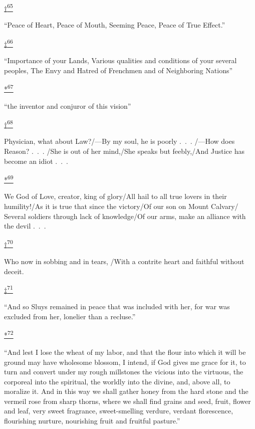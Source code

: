 \protect\hypertarget{23_NOTES.xhtmlux5cux23id_2824}{\protect\hyperlink{21_Chapter_Thirteen__IMAGE_AND_WORD.xhtmlux5cux23id_2823}{†\textsuperscript{65}}}
``Peace of Heart, Peace of Mouth, Seeming Peace, Peace of True Effect.''

\protect\hypertarget{23_NOTES.xhtmlux5cux23id_2822}{\protect\hyperlink{21_Chapter_Thirteen__IMAGE_AND_WORD.xhtmlux5cux23id_2821}{‡\textsuperscript{66}}}
``Importance of your Lands, Various qualities and conditions of your
several peoples, The Envy and Hatred of Frenchmen and of Neighboring
Nations''

\protect\hypertarget{23_NOTES.xhtmlux5cux23id_2820}{\protect\hyperlink{21_Chapter_Thirteen__IMAGE_AND_WORD.xhtmlux5cux23id_2819}{*\textsuperscript{67}}}
``the inventor and conjuror of this vision''

\protect\hypertarget{23_NOTES.xhtmlux5cux23id_2818}{\protect\hyperlink{21_Chapter_Thirteen__IMAGE_AND_WORD.xhtmlux5cux23id_2817}{†\textsuperscript{68}}}
Physician, what about Law?/---By my soul, he is poorly .~.~. /---How
does Reason? .~.~. /She is out of her mind,/She speaks but feebly,/And
Justice has become an idiot .~.~.

\protect\hypertarget{23_NOTES.xhtmlux5cux23id_2816}{\protect\hyperlink{21_Chapter_Thirteen__IMAGE_AND_WORD.xhtmlux5cux23id_2815}{*\textsuperscript{69}}}
We God of Love, creator, king of glory/All hail to all true lovers in
their humility!/As it is true that since the victory/Of our son on Mount
Calvary/ Several soldiers through lack of knowledge/Of our arms, make an
alliance with the devil .~.~.

\protect\hypertarget{23_NOTES.xhtmlux5cux23id_2814}{\protect\hyperlink{21_Chapter_Thirteen__IMAGE_AND_WORD.xhtmlux5cux23id_2813}{†\textsuperscript{70}}}
Who now in sobbing and in tears, /With a contrite heart and faithful
without deceit.

\protect\hypertarget{23_NOTES.xhtmlux5cux23id_2812}{\protect\hyperlink{21_Chapter_Thirteen__IMAGE_AND_WORD.xhtmlux5cux23id_2811}{‡\textsuperscript{71}}}
``And so Sluys remained in peace that was included with her, for war was
excluded from her, lonelier than a recluse.''

\protect\hypertarget{23_NOTES.xhtmlux5cux23id_2810}{\protect\hyperlink{21_Chapter_Thirteen__IMAGE_AND_WORD.xhtmlux5cux23id_2809}{*\textsuperscript{72}}}
``And lest I lose the wheat of my labor, and that the flour into which
it will be ground may have wholesome blossom, I intend, if God gives me
grace for it, to turn and convert under my rough millstones the vicious
into the virtuous, the corporeal into the spiritual, the worldly into
the divine, and, above all, to moralize it. And in this way we shall
gather honey from the hard stone and the vermeil rose from sharp thorns,
where we shall find grains and seed, fruit, flower and leaf, very sweet
fragrance, sweet-smelling verdure, verdant florescence, flourishing
nurture, nourishing fruit and fruitful pasture.''

